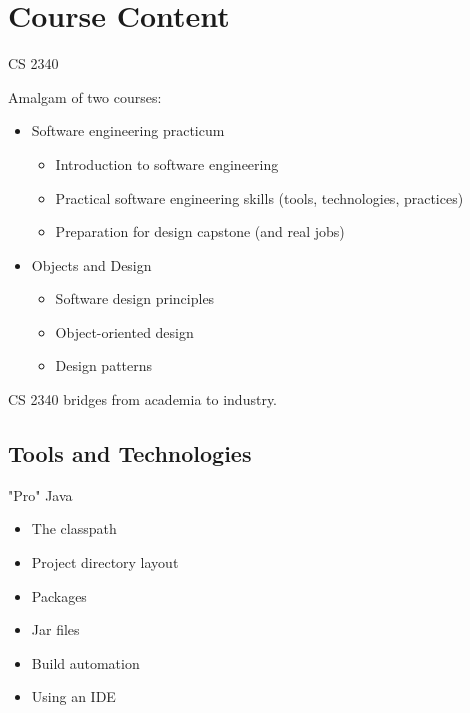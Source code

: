 \documentclass{beamer}
\begin{document}
\section{Course Content}

\begin{frame}[fragile]{CS 2340}

Amalgam of two courses:
\begin{itemize}
\item Software engineering practicum
\begin{itemize}
\item Introduction to software engineering
\item Practical software engineering skills (tools, technologies, practices)
\item Preparation for design capstone (and real jobs)
\end{itemize}
\item Objects and Design
\begin{itemize}
\item Software design principles
\item Object-oriented design
\item Design patterns
\end{itemize}
\end{itemize}

CS 2340 bridges from academia to industry.


\end{frame}

\subsection{Tools and Technologies}

\begin{frame}[fragile]{"Pro" Java}

\begin{itemize}
\item The classpath
\item Project directory layout
\item Packages
\item Jar files
\item Build automation
\item Using an IDE
\end{itemize}


\end{frame}
\end{document}
